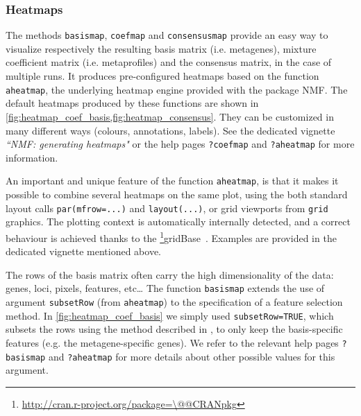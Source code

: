 \documentclass[a4paper]{article}\usepackage{graphicx, color}
\makeatletter
\let\code=\texttt
\newcommand{\pkgname}[1]{\textit{#1}\xspace}
\newcommand{\CRANurl}[1]{\url{http://cran.r-project.org/package=#1}}
\def\CRANpkg{\@ifstar\@CRANpkg\@@CRANpkg}
\def\@CRANpkg#1{\href{http://cran.r-project.org/package=#1}{\pkgname{#1}}\footnote{\CRANurl{#1}}}
\def\@@CRANpkg#1{\href{http://cran.r-project.org/package=#1}{\pkgname{#1}} package\footnote{\CRANurl{#1}}}
\newcommand{\citeCRANpkg}[1]{\CRANpkg{#1}~\cite{#1}}
\makeatother
\begin{document}
\subsubsection*{Heatmaps}

The methods \code{basismap}, \code{coefmap} and \code{consensusmap} provide an
easy way to visualize respectively the resulting basis matrix (i.e. metagenes),
mixture coefficient matrix (i.e. metaprofiles) and the consensus matrix, in the
case of multiple runs.
It produces pre-configured heatmaps based on the function \code{aheatmap}, the
underlying heatmap engine provided with the package NMF. 
The default heatmaps produced by these functions are shown in
\cref{fig:heatmap_coef_basis,fig:heatmap_consensus}.
They can be customized in many different ways (colours, annotations, labels).
See the dedicated vignette \emph{``NMF: generating heatmaps"} or the help pages
\code{?coefmap} and \code{?aheatmap} for more information.

An important and unique feature of the function \code{aheatmap}, is that it
makes it possible to combine several heatmaps on the same plot, using the both
standard layout calls \texttt{par(mfrow=...)} and \texttt{layout(...)}, or grid
viewports from \texttt{grid} graphics.
The plotting context is automatically internally detected, and a correct
behaviour is achieved thanks to the \citeCRANpkg{gridBase}.
Examples are provided in the dedicated vignette mentioned above.

The rows of the basis matrix often carry the high dimensionality of the data: genes, loci, pixels, features, etc\ldots 
The function \code{basismap} extends the use of argument \code{subsetRow} (from \code{aheatmap}) to the specification of a feature selection method.
In \cref{fig:heatmap_coef_basis} we simply used \code{subsetRow=TRUE}, which subsets the rows using the method described in \cite{KimH2007}, to only keep the basis-specific features (e.g. the metagene-specific genes). 
We refer to the relevant help pages \code{?basismap} and \code{?aheatmap} for more details about other possible values for this argument.
\end{document}
